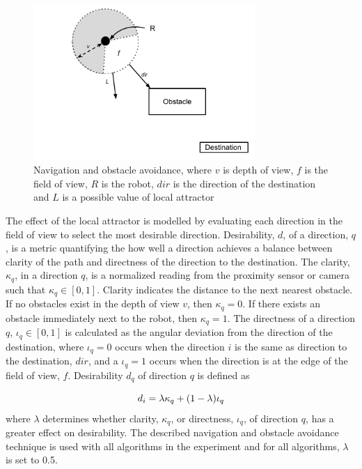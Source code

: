 \begin{figure}
	\centering
	\includegraphics[width=0.75\textwidth]{chapters/chapter5/figures/ObstacleAvoidance.pdf}
	\caption{Navigation and obstacle avoidance, where $v$ is depth of view, $f$ is the field of view, $R$ is the robot, $dir$ is the direction of the destination and $L$ is a possible value of local attractor}
	\label{fig:obstacleavoidance}
\end{figure}

The effect of the local attractor is modelled by evaluating each direction in the field of view to select the most desirable direction. Desirability, $d$, of a direction, $q$, is a metric quantifying the how well a direction achieves a balance between clarity of the path and directness of the direction to the destination. The clarity, $\kappa_q$, in a direction $q$, is a normalized reading from the proximity sensor or camera such that $\kappa_q\in[0,1]$. Clarity indicates the distance to the next nearest obstacle. If no obstacles exist in the depth of view $v$, then  $\kappa_q=0$. If there exists an obstacle immediately next to the robot, then $\kappa_q=1$. The directness of a direction $q$, $\iota_q\in[0,1]$ is calculated as the angular deviation from the direction of the destination, where $\iota_q=0$ occurs when the direction $i$ is the same as direction to the destination, $dir$, and a $\iota_q=1$ occurs when the direction is at the edge of the field of view, $f$. Desirability $d_q$ of direction $q$ is defined as

\begin{equation}
	d_i= \lambda \kappa_q + (1 - \lambda)\iota_q \\
	\label{eq:1}
\end{equation} where $\lambda$ determines whether clarity, $\kappa_q$, or directness, $\iota_q$, of direction $q$, has a greater effect on desirability. The described navigation and obstacle avoidance technique is used with all algorithms in the experiment and for all algorithms, $\lambda$ is set to 0.5.




